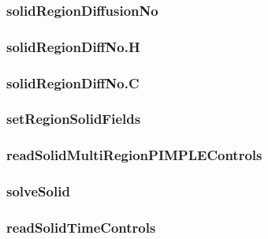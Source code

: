 \subsubsection*{solidRegionDiffusionNo}

\subsubsection*{solidRegionDiffNo.H}

\subsubsection*{solidRegionDiffNo.C}

\subsubsection*{setRegionSolidFields}

\subsubsection*{readSolidMultiRegionPIMPLEControls}

\subsubsection*{solveSolid}

\subsubsection*{readSolidTimeControls}

